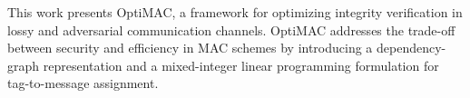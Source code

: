 






This work presents OptiMAC, a framework for optimizing integrity verification in lossy and adversarial communication channels. OptiMAC addresses the trade-off between security and efficiency in MAC schemes by introducing a dependency-graph representation and a mixed-integer linear programming formulation for tag-to-message assignment. 

